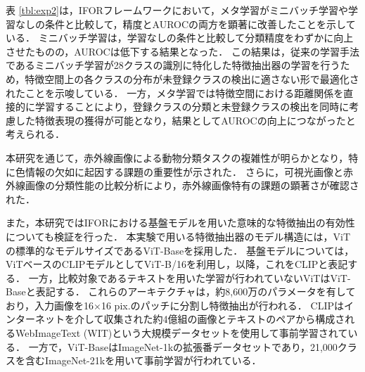 \documentclass[a4paper,11pt,nomag]{jsreport}
\begin{document}
表 \ref{tbl:exp2}は，IFORフレームワークにおいて，メタ学習がミニバッチ学習や学習なしの条件と比較して，精度とAUROCの両方を顕著に改善したことを示している．
ミニバッチ学習は，学習なしの条件と比較して分類精度をわずかに向上させたものの，AUROCは低下する結果となった．
この結果は，従来の学習手法であるミニバッチ学習が28クラスの識別に特化した特徴抽出器の学習を行うため，特徴空間上の各クラスの分布が未登録クラスの検出に適さない形で最適化されたことを示唆している．
一方，メタ学習では特徴空間における距離関係を直接的に学習することにより，登録クラスの分類と未登録クラスの検出を同時に考慮した特徴表現の獲得が可能となり，結果としてAUROCの向上につながったと考えられる．

本研究を通じて，赤外線画像による動物分類タスクの複雑性が明らかとなり，特に色情報の欠如に起因する課題の重要性が示された．
さらに，可視光画像と赤外線画像の分類性能の比較分析により，赤外線画像特有の課題の顕著さが確認された．

また，本研究ではIFORにおける基盤モデルを用いた意味的な特徴抽出の有効性についても検証を行った．
本実験で用いる特徴抽出器のモデル構造には，ViTの標準的なモデルサイズであるViT-Baseを採用した．
基盤モデルについては，ViTベースのCLIPモデルとしてViT-B/16を利用し，以降，これをCLIPと表記する．
一方，比較対象であるテキストを用いた学習が行われていないViTはViT-Baseと表記する．
これらのアーキテクチャは，約8,600万のパラメータを有しており，入力画像を16$\times$16 pix.のパッチに分割し特徴抽出が行われる．
CLIPはインターネットを介して収集された約4億組の画像とテキストのペアから構成されるWebImageText (WIT)という大規模データセットを使用して事前学習されている．
一方で，ViT-BaseはImageNet-1kの拡張番データセットであり，21,000クラスを含むImageNet-21kを用いて事前学習が行われている．
\end{document}
